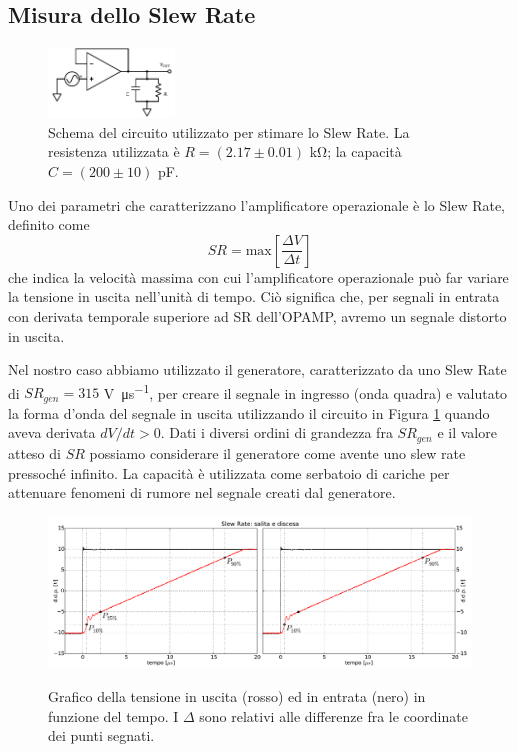 \subsection{Misura dello Slew Rate}

\begin{figure}
  \begin{center}
    \includegraphics[width=0.30\textwidth]{../E03/latex/slew_rate.pdf}
  \end{center}
  \caption{Schema del circuito utilizzato per stimare lo Slew Rate. La resistenza utilizzata è $R=(2.17\pm0.01)$ \si{\kilo\ohm}; la capacità $C=(200 \pm 10)$ \si{\pico\farad}.}
  \label{cir3:slew_rate}
\end{figure}

Uno dei parametri che caratterizzano l'amplificatore operazionale è lo Slew Rate, definito come
$$SR = \mathrm{max}\left[\frac{\Delta V}{\Delta t}\right]$$
che indica la velocità massima con cui l'amplificatore operazionale può far variare la tensione in uscita nell'unità di tempo. Ciò significa che, per segnali in entrata con derivata temporale superiore ad SR dell'OPAMP, avremo un segnale distorto in uscita.

Nel nostro caso abbiamo utilizzato il generatore, caratterizzato da uno Slew Rate di $SR_{gen}=315$ \si{\volt\per\micro\second}, per creare il segnale in ingresso (onda quadra) e valutato la forma d'onda del segnale in uscita utilizzando il circuito in Figura \ref{cir3:slew_rate} quando aveva derivata $dV/dt > 0$. Dati i diversi ordini di grandezza fra $SR_{gen}$ e il valore atteso di $SR$ possiamo considerare il generatore come avente uno slew rate pressoché infinito. La capacità è utilizzata come serbatoio di cariche per attenuare fenomeni di rumore nel segnale creati dal generatore.

\begin{figure}[ht]
 \centering
   {\includegraphics[width=\textwidth]{../E03/latex/sr_uad.pdf}}
 \caption{Grafico della tensione in uscita (rosso) ed in entrata (nero) in funzione del tempo. I $\Delta$ sono relativi alle differenze fra le coordinate dei punti segnati.}
 \label{gr3:slew_rate}
\end{figure}

